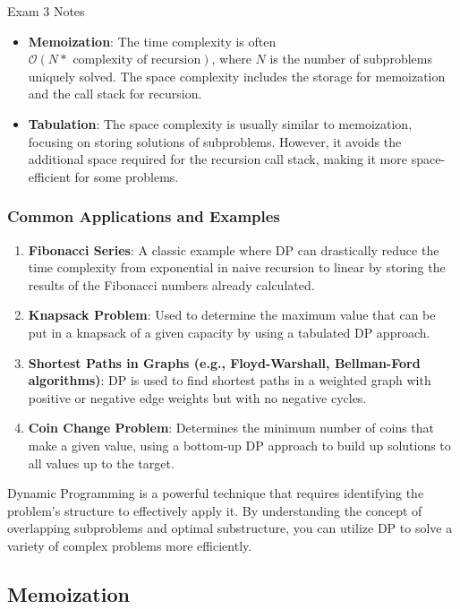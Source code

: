 \begin{examnotes}{Exam 3 Notes}
    \begin{itemize}
        \item \textbf{Memoization}: The time complexity is often $\mathcal{O}(N * \text{ complexity of recursion})$, where $N$ is the number of subproblems uniquely solved. The space complexity 
        includes the storage for memoization and the call stack for recursion.
        \item \textbf{Tabulation}: The space complexity is usually similar to memoization, focusing on storing solutions of subproblems. However, it avoids the additional space required for the 
        recursion call stack, making it more space-efficient for some problems.
    \end{itemize}

    \subsubsection*{Common Applications and Examples}

    \begin{enumerate}
        \item \textbf{Fibonacci Series}: A classic example where DP can drastically reduce the time complexity from exponential in naive recursion to linear by storing the results of the Fibonacci 
        numbers already calculated.
        \item \textbf{Knapsack Problem}: Used to determine the maximum value that can be put in a knapsack of a given capacity by using a tabulated DP approach.
        \item \textbf{Shortest Paths in Graphs (e.g., Floyd-Warshall, Bellman-Ford algorithms)}: DP is used to find shortest paths in a weighted graph with positive or negative edge weights but with 
        no negative cycles.
        \item \textbf{Coin Change Problem}: Determines the minimum number of coins that make a given value, using a bottom-up DP approach to build up solutions to all values up to the target.
    \end{enumerate}

    Dynamic Programming is a powerful technique that requires identifying the problem's structure to effectively apply it. By understanding the concept of overlapping subproblems and optimal substructure, 
    you can utilize DP to solve a variety of complex problems more efficiently.

    \subsection*{Memoization}


\end{examnotes}
